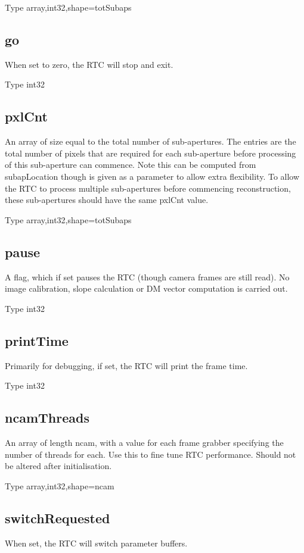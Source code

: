 \documentclass[a4,10pt]{article}
\begin{document}
Type array,int32,shape=totSubaps

\subsection{go}
When set to zero, the RTC will stop and exit.

Type int32

\subsection{pxlCnt}
An array of size equal to the total number of sub-apertures.  The
entries are the total number of pixels that are required for each
sub-aperture before processing of this sub-aperture can commence.
Note this can be computed from subapLocation though is given as a
parameter to allow extra flexibility.  To allow the RTC to process
multiple sub-apertures before commencing reconstruction, these
sub-apertures should have the same pxlCnt value.

Type array,int32,shape=totSubaps

\subsection{pause}
A flag, which if set pauses the RTC (though camera frames are still
read).  No image calibration, slope calculation or DM vector
computation is carried out.

Type int32

\subsection{printTime}
Primarily for debugging, if set, the RTC will print the frame time.

Type int32

\subsection{ncamThreads}
An array of length ncam, with a value for each frame grabber
specifying the number of threads for each.  Use this to fine tune RTC
performance.  Should not be altered after initialisation.

Type array,int32,shape=ncam

\subsection{switchRequested}
When set, the RTC will switch parameter buffers.
\end{document}
